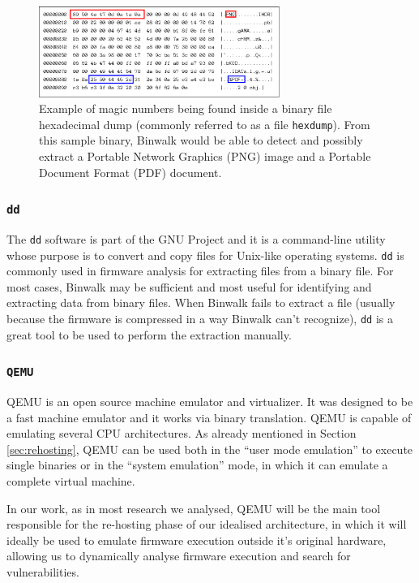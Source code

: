 \begin{figure}[H]
    \centering
    \includegraphics[width=0.7\textwidth]{figs/binwalk.eps}
    \caption{Example of magic numbers being found inside a binary file hexadecimal dump (commonly referred to as a file {\tt hexdump}). From this sample binary, Binwalk would be able to detect and possibly extract a Portable Network Graphics (PNG) image and a Portable Document Format (PDF) document.}
    \label{fig:binwalk}
\end{figure}


\subsubsection{ {\tt dd} }

The {\tt dd} software is part of the GNU Project and it is a command-line utility whose purpose is to convert and copy files for Unix-like operating systems. {\tt dd} is commonly used in firmware analysis for extracting files from a binary file. For most cases, Binwalk may be sufficient and most useful for identifying and extracting data from binary files. When Binwalk fails to extract a file (usually because the firmware is compressed in a way Binwalk can't recognize), {\tt dd} is a great tool to be used to perform the extraction manually.

\subsubsection{ {\tt QEMU} }
\label{sec:qemu}

QEMU \cite{qemu} is an open source machine emulator and virtualizer. It was designed to be a fast machine emulator and it works via binary translation. QEMU is capable of emulating several CPU architectures. As already mentioned in Section \ref{sec:rehosting}, QEMU can be used both in the ``user mode emulation'' to execute single binaries or in the ``system emulation'' mode, in which it can emulate a complete virtual machine.

In our work, as in most research we analysed, QEMU will be the main tool responsible for the re-hosting phase of our idealised architecture, in which it will ideally be used to emulate firmware execution outside it's original hardware, allowing us to dynamically analyse firmware execution and search for vulnerabilities.

